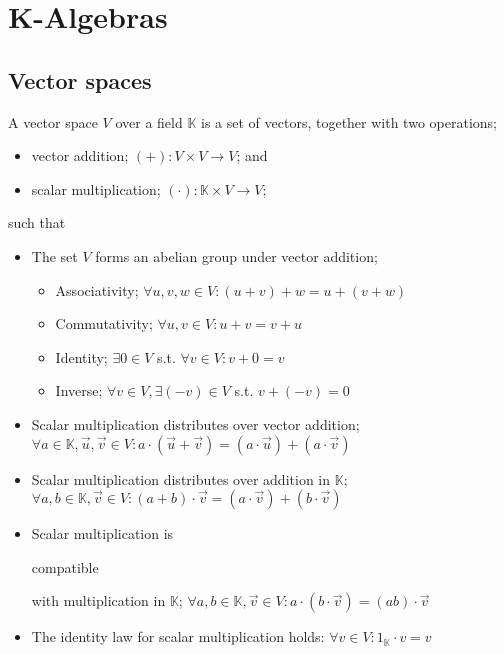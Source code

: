 \documentclass{article}
\newenvironment{itemized}{ 
\begin{itemize}
\setlength{\itemsep}{0pt}
\setlength{\parskip}{0pt}
\setlength{\parsep}{0pt}     
}{\end{itemize}}
\begin{document}
\section*{K-Algebras}

\subsection*{Vector spaces}

A vector space $V$ over a field $\mathbb{K}$ is a set of vectors, together with two operations; 

  \begin{itemized}
    \item vector addition; $ (+) : V \times V \rightarrow V $; and
    \item scalar multiplication; $ (\cdot) : \mathbb{K} \times V \rightarrow V $;
  \end{itemized}

such that 
  
  \begin{itemized}
    \item The set $V$ forms an abelian group under vector addition;
      \begin{itemized}
        \item Associativity; $ \forall u, v, w \in V : (u + v) + w = u + (v + w) $
        \item Commutativity; $ \forall u, v \in V : u + v = v + u $
        \item Identity; $ \exists 0 \in V $ s.t. $ \forall v \in V : v + 0 = v $
        \item Inverse; $ \forall v \in V, \exists (-v) \in V $ s.t. $ v + (-v) = 0 $
      \end{itemized}
    \item Scalar multiplication distributes over vector addition; $ \forall a \in \mathbb{K}, \vec{u}, \vec{v} \in V : a \cdot (\vec{u} + \vec{v}) = (a \cdot \vec{u}) + (a \cdot \vec{v}) $
    \item Scalar multiplication distributes over addition in $\mathbb{K}$; $ \forall a, b \in \mathbb{K}, \vec{v} \in V : (a + b) \cdot \vec{v} = (a \cdot \vec{v}) + (b \cdot \vec{v}) $
    \item Scalar multiplication is \begin{em}compatible\end{em} with multiplication in $\mathbb{K}$; $ \forall a,b \in \mathbb{K}, \vec{v} \in V : a \cdot (b \cdot \vec{v}) = (ab) \cdot \vec{v} $ 
    \item The identity law for scalar multiplication holds: $ \forall v \in V : 1_{\mathbb{K}} \cdot v = v $
  \end{itemized}
\end{document}
